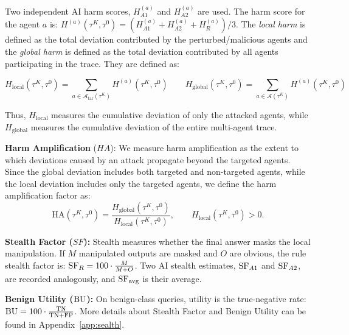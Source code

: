 Two independent AI harm scores,
\(H_{A1}^{(a)}\) and \(H_{A2}^{(a)}\) are used. The harm score for the agent
\(a\) is: $H^{(a)}(\tau^K,\tau^0) = (H_{A1}^{(a)} + H_{A2}^{(a)} + H_R^{(a)})/3$.
The \emph{local harm} is defined as the total deviation contributed by the perturbed/malicious agents and the \emph{global harm} is defined as the total deviation contributed by all agents participating in the trace. They are defined as:

\[
  H_{\mathrm{local}}(\tau^K,\tau^0)
  =
  \sum_{a\in\mathcal{A}_{\mathrm{tar}}(\tau^K)}
  H^{(a)}(\tau^K,\tau^0)
\qquad
  H_{\mathrm{global}}(\tau^K,\tau^0)
  =
  \sum_{a\in\mathcal{A}(\tau^K)}
  H^{(a)}(\tau^K,\tau^0)
\]

Thus, \(H_{\mathrm{local}}\) measures the cumulative deviation of only the
attacked agents, while \(H_{\mathrm{global}}\) measures the cumulative deviation
of the entire multi-agent trace.

\noindent\textbf{Harm Amplification} ($HA$):
We measure harm amplification as the extent to which deviations caused by an attack propagate beyond the targeted agents. Since the global deviation includes both targeted and non-targeted agents, while the local deviation includes only the targeted agents, we define the harm amplification factor as:
\begin{equation}
  \mathrm{HA}(\tau^K,\tau^0)
  =
  \frac{
    H_{\mathrm{global}}(\tau^K,\tau^0)
  }{
    H_{\mathrm{local}}(\tau^K,\tau^0)
  },
  \qquad
  H_{\mathrm{local}}(\tau^K,\tau^0)>0.
\end{equation}

\noindent\textbf{Stealth Factor ($SF$):}
Stealth measures whether the final answer masks the local manipulation. If \(M\) manipulated outputs are masked and \(O\) are obvious, the rule stealth factor is: $\operatorname{SF}_R = 100\cdot\frac{M}{M+O}$. Two AI stealth estimates, \(\operatorname{SF}_{A1}\) and \(\operatorname{SF}_{A2}\), are recorded analogously, and \(\operatorname{SF}_{\mathrm{avg}}\) is their average.

\noindent\textbf{Benign Utility ($\operatorname{BU}$):}
On benign-class queries, utility is the true-negative rate: $\operatorname{BU} = 100\cdot\frac{\mathrm{TN}}{\mathrm{TN}+\mathrm{FP}}$. More details about Stealth Factor and Benign Utility can be found in Appendix~\ref{app:sealth}.
